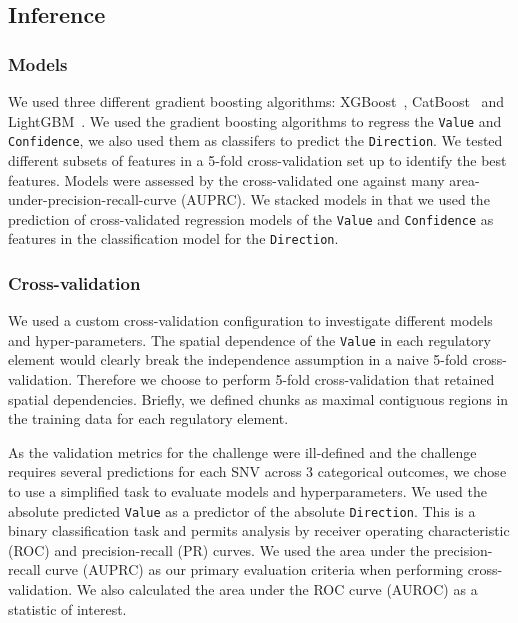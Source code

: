 \documentclass{article}
\begin{document}
\subsection*{Inference}


\subsubsection*{Models}

We used three different gradient boosting algorithms:
XGBoost~\cite{ChenXGBoostScalableTree2016},
CatBoost~\cite{ProkhorenkovaCatBoostunbiasedboosting2017} and
LightGBM~\cite{KeLightGBMHighlyEfficient2017}. We used the gradient boosting
algorithms to regress the \texttt{Value} and \texttt{Confidence}, we also used
them as classifers to predict the \texttt{Direction}. We tested different
subsets of features in a 5-fold cross-validation set up to identify the best
features.  Models were assessed by the cross-validated one against many
area-under-precision-recall-curve (AUPRC). We stacked models in that we used
the prediction of cross-validated regression models of the \texttt{Value} and
\texttt{Confidence} as features in the classification model for the
\texttt{Direction}.


\subsubsection*{Cross-validation}

We used a custom cross-validation configuration to investigate different models
and hyper-parameters.  The spatial dependence of the \texttt{Value} in each
regulatory element would clearly break the independence assumption in a naive
5-fold cross-validation.  Therefore we choose to perform 5-fold
cross-validation that retained spatial dependencies. Briefly, we defined chunks
as maximal contiguous regions in the training data for each regulatory element.

As the validation metrics for the challenge were ill-defined and the challenge
requires several predictions for each SNV across 3 categorical outcomes, we
chose to use a simplified task to evaluate models and hyperparameters. We used
the absolute predicted \texttt{Value} as a predictor of the absolute
\texttt{Direction}.  This is a binary classification task and permits analysis
by receiver operating characteristic (ROC) and precision-recall (PR) curves. We
used the area under the precision-recall curve (AUPRC) as our primary
evaluation criteria when performing cross-validation. We also calculated the
area under the ROC curve (AUROC) as a statistic of interest.
\end{document}
